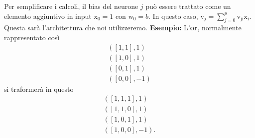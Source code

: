 Per semplificare i calcoli, il bias del neurone $j$ può essere trattato come un elemento aggiuntivo in input  $\text{x}_0 =1$ con $\text{w}_0 =b$.
\newline
In questo caso, $\text{v}_j=\sum_{j=0}^p\text{v}_{\text{ji}}\text{x}_\text{i}$. \newline
Questa sarà l'architettura che noi utilizzeremo.\newline
\newline
\textbf{Esempio:}\newline
L'\textbf{or}, normalmente rappresentato così
\begin{gather}
    ([1,1], 1)\\
    ([1,0], 1)\\
    ([0,1], 1)\\
    ([0,0], -1)
\end{gather}
si traformerà in questo
\begin{gather}
    ([1,1,1], 1)\\ 
    ([1,1,0], 1)\\
    ([1,0,1], 1)\\
    ([1,0,0],-1).
\end{gather}
\newpage
